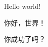 \documentclass[11pt]{article}  %
\begin{document}
  Hello world!

  你好，世界！

  你成功了吗？
\end{document}
